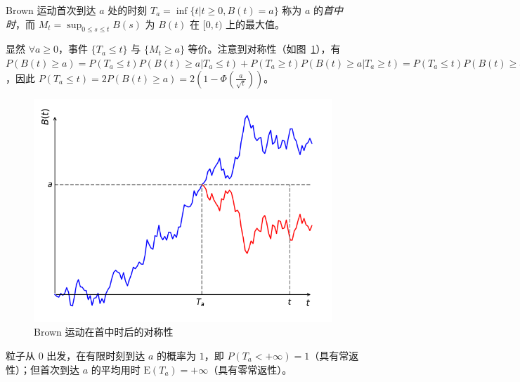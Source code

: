 \documentclass[../main.tex]{subfiles}
\begin{document}
Brown 运动首次到达 $a$ 处的时刻 $T_a=\inf\{t|t\geq0,B(t)=a\}$ 称为 $a$ 的\emph{首中时}，而 $M_t=\sup_{0\leq s\leq t}B(s)$ 为 $B(t)$ 在 $[0,t)$ 上的最大值。

显然 $\forall a\geq0$，事件 $\{T_a\leq t\}$ 与 $\{M_t\geq a\}$ 等价。注意到对称性（如图~\ref{fig:8.3.1}），有 $P(B(t)\geq a)=P(T_a\leq t)P(B(t)\geq a|T_a\leq t)+P(T_a\geq t)P(B(t)\geq a|T_a\geq t)=P(T_a\leq t)P(B(t)\geq a|T_a\leq t)=\frac12P(T_a\leq t)$，因此 $P(T_a\leq t)=2P(B(t)\geq a)=2(1-\Phi(\frac a{\sqrt t}))$。

\begin{figure}[!h]
    \centering
    \includegraphics[scale=0.7]{figures/brownian_motion_symmetry.png}
    \caption{Brown 运动在首中时后的对称性}
    \label{fig:8.3.1}
\end{figure}

\begin{proposition}
    粒子从 $0$ 出发，在有限时刻到达 $a$ 的概率为 $1$，即 $P(T_a<+\infty)=1$（具有常返性）；但首次到达 $a$ 的平均用时 $\mathrm E(T_a)=+\infty$（具有零常返性）。
\end{proposition}
\end{document}
